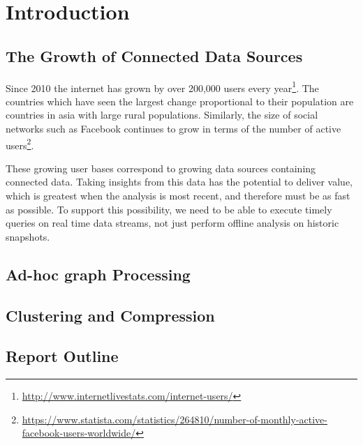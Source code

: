 \chapter{Introduction}

\section{The Growth of Connected Data Sources}

Since 2010 the internet has grown by over 200,000 users every year\footnote{\url{http://www.internetlivestats.com/internet-users/}}. The countries which have seen the largest change
proportional to their population are countries in asia with large rural populations. Similarly, the
size of social networks such as Facebook continues to grow in terms of the number of active
users\footnote{\url{https://www.statista.com/statistics/264810/number-of-monthly-active-facebook-users-worldwide/}}.

These growing user bases correspond to growing data sources containing connected data. Taking
insights from this data has the potential to deliver value, which is greatest when the analysis is
most recent, and therefore must be as fast as possible. To support this possibility, we need to be
able to execute timely queries on real time data streams, not just perform offline analysis on
historic snapshots.

\section{Ad-hoc graph Processing}



\section{Clustering and Compression}

\section{Report Outline}
